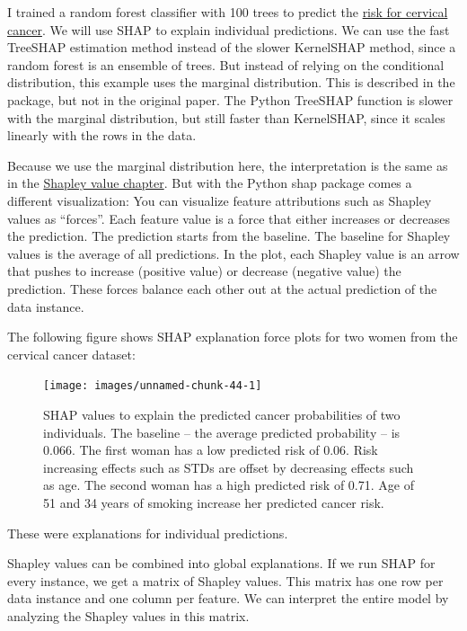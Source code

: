 \documentclass[
  12pt,
]{krantz}
\begin{document}
I trained a random forest classifier with 100 trees to predict the \protect\hyperlink{cervical}{risk for cervical cancer}.
We will use SHAP to explain individual predictions.
We can use the fast TreeSHAP estimation method instead of the slower KernelSHAP method, since a random forest is an ensemble of trees.
But instead of relying on the conditional distribution, this example uses the marginal distribution.
This is described in the package, but not in the original paper.
The Python TreeSHAP function is slower with the marginal distribution, but still faster than KernelSHAP, since it scales linearly with the rows in the data.

Because we use the marginal distribution here, the interpretation is the same as in the \protect\hyperlink{shapley}{Shapley value chapter}.
But with the Python shap package comes a different visualization:
You can visualize feature attributions such as Shapley values as ``forces''.
Each feature value is a force that either increases or decreases the prediction.
The prediction starts from the baseline.
The baseline for Shapley values is the average of all predictions.
In the plot, each Shapley value is an arrow that pushes to increase (positive value) or decrease (negative value) the prediction.
These forces balance each other out at the actual prediction of the data instance.

The following figure shows SHAP explanation force plots for two women from the cervical cancer dataset:

\begin{figure}

{\centering \texttt{[image: images/unnamed-chunk-44-1]} 

}

\caption{SHAP values to explain the predicted cancer probabilities of two individuals. The baseline -- the average predicted probability -- is 0.066. The first woman has a low predicted risk of 0.06. Risk increasing effects such as STDs are offset by decreasing effects such as age. The second woman has a high predicted risk of 0.71. Age of 51 and 34 years of smoking increase her predicted cancer risk.}\label{fig:unnamed-chunk-44}
\end{figure}

These were explanations for individual predictions.

Shapley values can be combined into global explanations.
If we run SHAP for every instance, we get a matrix of Shapley values.
This matrix has one row per data instance and one column per feature.
We can interpret the entire model by analyzing the Shapley values in this matrix.
\end{document}
